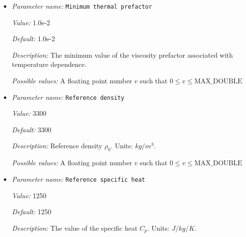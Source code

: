 \begin{itemize}
{\it Value:} 1.0e2


{\it Default:} 1.0e2


{\it Description:} The maximum value of the viscosity prefactor associated with temperature dependence.


{\it Possible values:} A floating point number $v$ such that $0 \leq v \leq \text{MAX\_DOUBLE}$
\item {\it Parameter name:} {\tt Minimum thermal prefactor}
\label{parameters:Material model/Simple model/Minimum thermal prefactor}
\label{parameters:Material_20model/Simple_20model/Minimum_20thermal_20prefactor}


{\it Value:} 1.0e-2


{\it Default:} 1.0e-2


{\it Description:} The minimum value of the viscosity prefactor associated with temperature dependence.


{\it Possible values:} A floating point number $v$ such that $0 \leq v \leq \text{MAX\_DOUBLE}$
\item {\it Parameter name:} {\tt Reference density}
\label{parameters:Material model/Simple model/Reference density}
\label{parameters:Material_20model/Simple_20model/Reference_20density}


{\it Value:} 3300


{\it Default:} 3300


{\it Description:} Reference density $\rho_0$. Units: $kg/m^3$.


{\it Possible values:} A floating point number $v$ such that $0 \leq v \leq \text{MAX\_DOUBLE}$
\item {\it Parameter name:} {\tt Reference specific heat}
\label{parameters:Material model/Simple model/Reference specific heat}
\label{parameters:Material_20model/Simple_20model/Reference_20specific_20heat}


{\it Value:} 1250


{\it Default:} 1250


{\it Description:} The value of the specific heat $C_p$. Units: $J/kg/K$.



\end{itemize}
